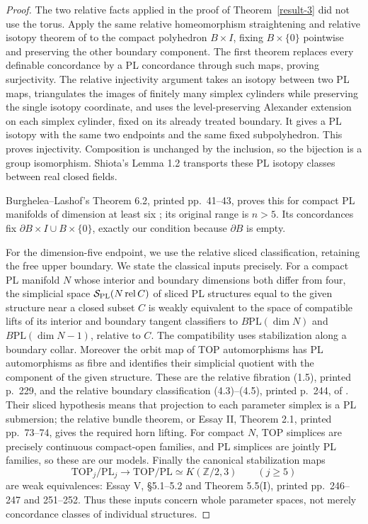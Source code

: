 \documentclass[11pt,a4paper]{article}
\theoremstyle{definition}
\begin{document}
\begin{proof}
The two relative facts applied in the proof of Theorem~\ref{result-3} did not use
the torus. Apply the same relative homeomorphism straightening
and relative isotopy theorem of \cite[Theorem 2.1 with complement;
Lemma 3.3, pp.~44--46]{Shiota2010} to the compact polyhedron
$B\times I$, fixing $B\times\{0\}$ pointwise and preserving the
other boundary component. The first theorem replaces every
definable concordance by a PL concordance through such maps,
proving surjectivity. The relative injectivity argument takes an
isotopy between two PL maps, triangulates the images of finitely
many simplex cylinders while preserving the single isotopy
coordinate, and uses the level-preserving Alexander extension
on each simplex cylinder, fixed on its already treated boundary.
It gives a PL isotopy with the same two endpoints and the same
fixed subpolyhedron. This proves injectivity. Composition is
unchanged by the inclusion, so the bijection is a group
isomorphism. Shiota's Lemma 1.2 transports these PL isotopy
classes between real closed fields.

Burghelea--Lashof's Theorem 6.2, printed pp.~41--43, proves
this for compact PL manifolds of dimension at least six
\cite{BurgheleaLashof1974II}; its original range is $n>5$.
Its concordances fix $\partial B\times I\cup B\times\{0\}$,
exactly our condition because $\partial B$ is empty.

For the dimension-five endpoint, we use the relative sliced
classification, retaining the free upper boundary. We state the
classical inputs precisely. For a compact PL manifold $N$ whose
interior and boundary dimensions both differ from four, the simplicial
space $\mathcal S_{\rm PL}(N\operatorname{rel} C)$ of sliced PL
structures equal to the given structure near a closed subset $C$
is weakly equivalent to the space of compatible lifts of its interior
and boundary tangent classifiers to
$B\mathrm{PL}(\dim N)$ and $B\mathrm{PL}(\dim N-1)$, relative to $C$.
The compatibility uses stabilization along a boundary collar.
Moreover the orbit map of TOP automorphisms has PL automorphisms as
fibre and identifies their simplicial quotient with the component of
the given structure. These are the relative fibration (1.5), printed
p.~229, and the relative boundary classification (4.3)--(4.5), printed
p.~244, of \cite[Essay V]{KirbySiebenmann1977}. Their sliced hypothesis
means that projection to each parameter simplex is a PL submersion;
the relative bundle theorem, or Essay II, Theorem 2.1, printed
pp.~73--74, gives the required horn lifting. For compact $N$, TOP
simplices are precisely continuous compact-open families, and PL
simplices are jointly PL families, so these are our models. Finally
the canonical
stabilization maps
\[
 \mathrm{TOP}_j/\mathrm{PL}_j\longrightarrow\mathrm{TOP}/\mathrm{PL}
       \simeq K(\mathbb Z/2,3)\qquad(j\ge5)
\]
are weak equivalences: Essay V, \S5.1--5.2 and Theorem 5.5(I), printed
pp.~246--247 and 251--252. Thus these inputs concern whole parameter
spaces, not merely concordance classes of individual structures.


\end{proof}
\end{document}
